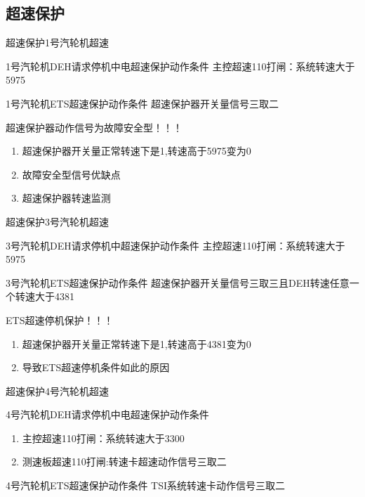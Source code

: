\documentclass[12pt,hyperref={CJKbookmarks=true}]{beamer} %
\begin{document}
\subsection{超速保护}
\begin{frame}{超速保护}{1号汽轮机超速}
\begin{block}{\heiti 1号汽轮机DEH请求停机中电超速保护动作条件}
				主控超速110打闸：系统转速大于5975
		\end{block}
\begin{block}{\heiti 1号汽轮机ETS超速保护动作条件}
				超速保护器开关量信号三取二
		\end{block}
\begin{alertblock}{\heiti 超速保护器动作信号为故障安全型！！！}
			\begin{enumerate}
				\item 超速保护器开关量正常转速下是1,转速高于5975变为0
				\item 故障安全型信号优缺点
				\item 超速保护器转速监测
			\end{enumerate}
	\end{alertblock}
\end{frame}
\begin{frame}{超速保护}{3号汽轮机超速}
\begin{block}{\heiti 3号汽轮机DEH请求停机中超速保护动作条件}
				主控超速110打闸：系统转速大于5975
		\end{block}
\begin{block}{\heiti 3号汽轮机ETS超速保护动作条件}
				超速保护器开关量信号三取三且DEH转速任意一个转速大于4381
		\end{block}
\begin{alertblock}{\heiti ETS超速停机保护！！！}
			\begin{enumerate}
				\item 超速保护器开关量正常转速下是1,转速高于4381变为0
				\item 导致ETS超速停机条件如此的原因
			\end{enumerate}
	\end{alertblock}
\end{frame}
\begin{frame}{超速保护}{4号汽轮机超速}
\begin{block}{\heiti 4号汽轮机DEH请求停机中电超速保护动作条件}
			\begin{enumerate}
				\item  主控超速110打闸：系统转速大于3300
				\item  测速板超速110打闸:转速卡超速动作信号三取二
		\end{enumerate}
		\end{block}
\begin{block}{\heiti 4号汽轮机ETS超速保护动作条件}
				TSI系统转速卡动作信号三取二
		\end{block}
\end{frame}
\end{document}
